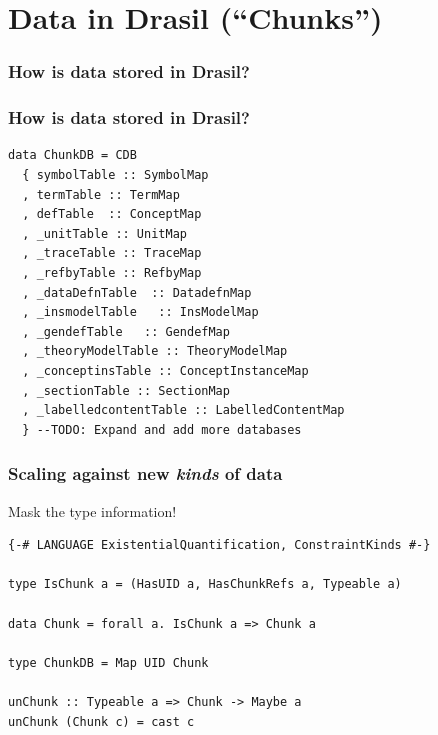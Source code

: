 \documentclass[xcolor={dvipsnames}]{beamer}
\begin{document}
\section{Data in Drasil (\textquotedblleft{}Chunks\textquotedblright{})}

\begin{frame}
  \frametitle{How is data stored in Drasil?}

  \centering
  

\end{frame}

\begin{frame}[fragile]
  \frametitle{How is data stored in Drasil?}

\begin{verbatim}
data ChunkDB = CDB 
  { symbolTable :: SymbolMap
  , termTable :: TermMap 
  , defTable  :: ConceptMap
  , _unitTable :: UnitMap
  , _traceTable :: TraceMap
  , _refbyTable :: RefbyMap
  , _dataDefnTable  :: DatadefnMap
  , _insmodelTable   :: InsModelMap
  , _gendefTable   :: GendefMap
  , _theoryModelTable :: TheoryModelMap
  , _conceptinsTable :: ConceptInstanceMap
  , _sectionTable :: SectionMap
  , _labelledcontentTable :: LabelledContentMap
  } --TODO: Expand and add more databases
\end{verbatim}

\end{frame}

\begin{frame}[fragile]
  \frametitle{Scaling against new \textit{kinds} of data}

  \begin{center}
    Mask the type information!
  \end{center}

\begin{verbatim}
{-# LANGUAGE ExistentialQuantification, ConstraintKinds #-}

type IsChunk a = (HasUID a, HasChunkRefs a, Typeable a)

data Chunk = forall a. IsChunk a => Chunk a

type ChunkDB = Map UID Chunk

unChunk :: Typeable a => Chunk -> Maybe a
unChunk (Chunk c) = cast c
\end{verbatim}
\end{frame}
\end{document}
